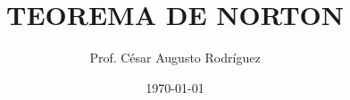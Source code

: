 \documentclass[a4paper, 12pt]{article}
\title{\textbf{TEOREMA DE NORTON}}
\author{Prof. César Augusto Rodríguez}
\date{\today}
\begin{document}

\maketitle
\tableofcontents
\newpage









\end{document}
